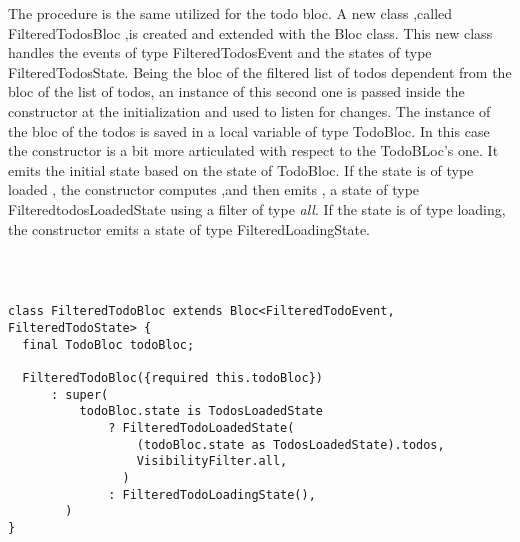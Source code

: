 The procedure is the same utilized for the todo bloc. A new class ,called FilteredTodosBloc ,is created and extended with the Bloc class. This new class handles the events of type FilteredTodosEvent and the states of type FilteredTodosState. Being the bloc of the filtered list of todos dependent from the bloc of the list of todos, an instance of this second one is passed inside the constructor at the initialization and used to listen for changes.
The instance of the bloc of the todos is saved in a local variable of type TodoBloc. In this case the constructor is a bit more articulated with respect to the TodoBLoc's one. It emits the initial state based on the state of TodoBloc. If the state is of type loaded , the constructor computes ,and then emits , a state of type FilteredtodosLoadedState using a filter of type \textit{all}. If the state is of type loading, the constructor emits a state of type FilteredLoadingState.
\begin{code}
\mbox{}\\
 \mbox{}
\label{code:2.14}
\begin{verbatim}

class FilteredTodoBloc extends Bloc<FilteredTodoEvent, FilteredTodoState> {
  final TodoBloc todoBloc;

  FilteredTodoBloc({required this.todoBloc})
      : super(
          todoBloc.state is TodosLoadedState
              ? FilteredTodoLoadedState(
                  (todoBloc.state as TodosLoadedState).todos,
                  VisibilityFilter.all,
                )
              : FilteredTodoLoadingState(),
        )  
}
\end{verbatim}
\mbox{}
\end{code}

